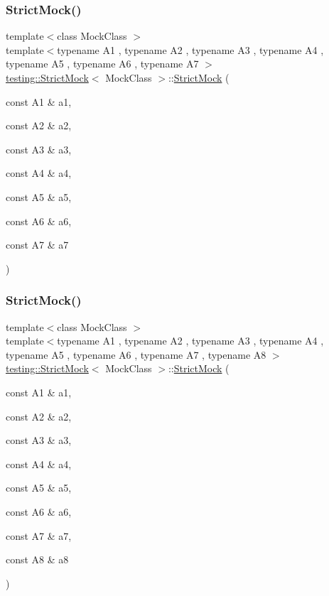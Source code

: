 \subsubsection{\texorpdfstring{StrictMock()}{StrictMock()}\hspace{0.1cm}{\footnotesize\ttfamily [14/17]}}
{\footnotesize\ttfamily template$<$class Mock\+Class $>$ \\
template$<$typename A1 , typename A2 , typename A3 , typename A4 , typename A5 , typename A6 , typename A7 $>$ \\
\mbox{\hyperlink{classtesting_1_1_strict_mock}{testing\+::\+Strict\+Mock}}$<$ Mock\+Class $>$\+::\mbox{\hyperlink{classtesting_1_1_strict_mock}{Strict\+Mock}} (\begin{DoxyParamCaption}\item[{const A1 \&}]{a1,  }\item[{const A2 \&}]{a2,  }\item[{const A3 \&}]{a3,  }\item[{const A4 \&}]{a4,  }\item[{const A5 \&}]{a5,  }\item[{const A6 \&}]{a6,  }\item[{const A7 \&}]{a7 }\end{DoxyParamCaption})\hspace{0.3cm}{\ttfamily [inline]}}

\mbox{\label{classtesting_1_1_strict_mock_aac6eaaad3e94491ada7bb43ee6149775}} 
\subsubsection{\texorpdfstring{StrictMock()}{StrictMock()}\hspace{0.1cm}{\footnotesize\ttfamily [15/17]}}
{\footnotesize\ttfamily template$<$class Mock\+Class $>$ \\
template$<$typename A1 , typename A2 , typename A3 , typename A4 , typename A5 , typename A6 , typename A7 , typename A8 $>$ \\
\mbox{\hyperlink{classtesting_1_1_strict_mock}{testing\+::\+Strict\+Mock}}$<$ Mock\+Class $>$\+::\mbox{\hyperlink{classtesting_1_1_strict_mock}{Strict\+Mock}} (\begin{DoxyParamCaption}\item[{const A1 \&}]{a1,  }\item[{const A2 \&}]{a2,  }\item[{const A3 \&}]{a3,  }\item[{const A4 \&}]{a4,  }\item[{const A5 \&}]{a5,  }\item[{const A6 \&}]{a6,  }\item[{const A7 \&}]{a7,  }\item[{const A8 \&}]{a8 }\end{DoxyParamCaption})\hspace{0.3cm}{\ttfamily [inline]}}

